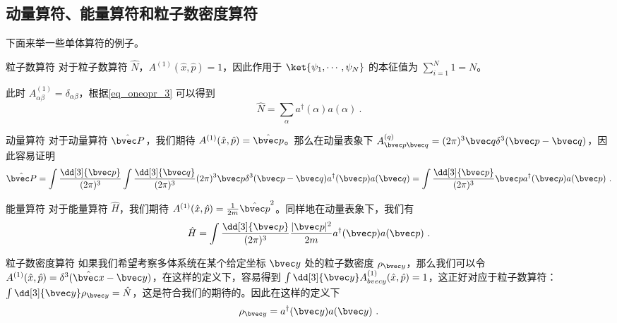\subsection{动量算符、能量算符和粒子数密度算符}
下面来举一些单体算符的例子。
\begin{example}{粒子数算符}
对于粒子数算符 $\hat N$，$A^{(1)}(\hat x,\hat p)=1$，因此作用于 $\ket{\psi_1,\cdots,\psi_N}$ 的本征值为 $\sum_{i=1}^N 1=N$。

此时 $A_{\alpha\beta}^{(1)}=\delta_{\alpha\beta}$，根据\autoref{eq_oneopr_3} 可以得到
\begin{equation}
\hat N=\sum_{\alpha} a^\dagger(\alpha) a(\alpha)~.
\end{equation}

\end{example}

\begin{example}{动量算符}
对于动量算符 $\hat{\bvec P}$，我们期待 $A^{(1)}(\hat x,\hat p)=\hat{\bvec p}$。那么在动量表象下 $A_{\bvec p\bvec q}^{(q)}=(2\pi)^3 \bvec q \delta^3(\bvec p-\bvec q)$，因此容易证明
\begin{equation}
\begin{aligned}
\hat{\bvec P}=\int\frac{\dd[3]{\bvec p}}{(2\pi)^3} \int\frac{\dd[3]{\bvec q}}{(2\pi)^3} (2\pi)^3 \bvec p \delta^3(\bvec p-\bvec q)a^\dagger(\bvec p)a(\bvec q)=\int\frac{\dd[3]{\bvec p}}{(2\pi)^3} \bvec p a^\dagger(\bvec p)a(\bvec p)~.
\end{aligned}
\end{equation}
\end{example}



\begin{example}{能量算符}
对于能量算符 $\hat H$，我们期待 $A^{(1)}(\hat x,\hat p)=\frac{1}{2m}\hat{\bvec p}^2$。同样地在动量表象下，我们有
\begin{equation}
\begin{aligned}
\hat{H}=\int\frac{\dd[3]{\bvec p}}{(2\pi)^3} \frac{|\bvec p|^2}{2m} a^\dagger(\bvec p)a(\bvec p)~.
\end{aligned}
\end{equation}
\end{example}

\begin{example}{粒子数密度算符}
如果我们希望考察多体系统在某个给定坐标 $\bvec y$ 处的粒子数密度 $\rho_{\bvec y}$，那么我们可以令 $A^{(1)}(\hat x,\hat p)=\delta^3(\hat{\bvec x}-\bvec y)$，在这样的定义下，容易得到 $\int \dd[3]{\bvec y} A^{(1)}_{\\bvec y}(\hat x,\hat p)=1$，这正好对应于粒子数算符：$\int \dd[3]{\bvec y} \rho_{\bvec y}=\hat N$，这是符合我们的期待的。因此在这样的定义下
\begin{equation}
\rho_{\bvec y}=a^\dagger(\bvec y)a(\bvec y)~.
\end{equation}

\end{example}
